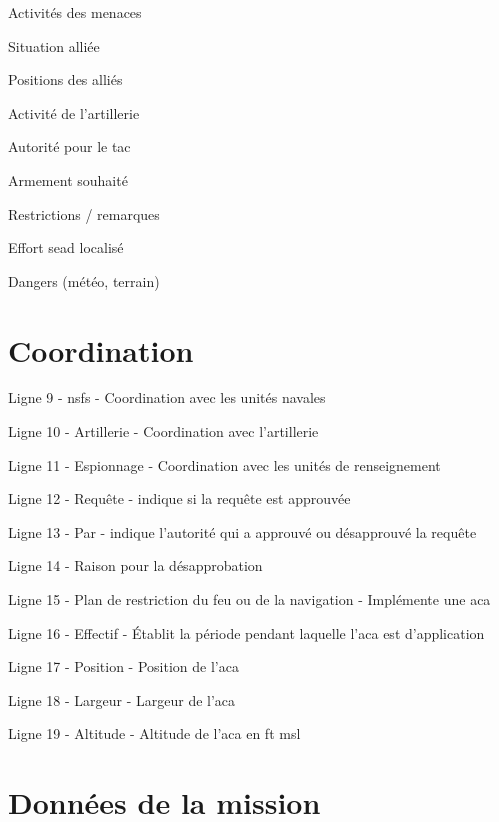 \begin{e2}[0em]
\begin{e3}[0em]
		\item Activités des menaces
		\item Situation alliée
		\item Positions des alliés
		\item Activité de l'artillerie
		\item Autorité pour le \gls{tac}
		\item Armement souhaité
		\item Restrictions / remarques
		\item Effort \gls{sead} localisé
		\item Dangers (météo, terrain)
	\end{e3}
\end{e2}

\section{Coordination}

\ree
	\item Ligne 9 - \gls{nsfs} - Coordination avec les unités navales
	\item Ligne 10 - Artillerie - Coordination avec l'artillerie
	\item Ligne 11 - Espionnage - Coordination avec les unités de renseignement
	\item Ligne 12 - Requête -  indique si la requête est approuvée
	\item Ligne 13 - Par - indique l'autorité qui a approuvé ou désapprouvé la requête
	\item Ligne 14 - Raison pour la désapprobation
	\item Ligne 15 - Plan de restriction du feu ou de la navigation - Implémente une \gls{aca}
	\item Ligne 16 - Effectif - Établit la période pendant laquelle l'\gls{aca} est d'application
	\item Ligne 17 - Position - Position de l'\gls{aca}
	\item Ligne 18 - Largeur - Largeur de l'\gls{aca}
	\item Ligne 19 - Altitude - Altitude de l'\gls{aca} en \gls{ft} \gls{msl}
\ed
	
\section{Données de la mission}	
	
